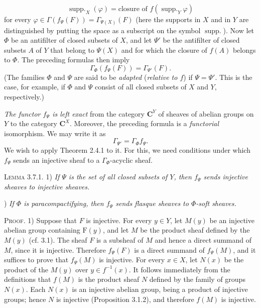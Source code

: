 
\[
\operatorname{supp.}_{X}(\varphi)
=\text{closure of }f(\operatorname{supp.}_{Y}\varphi)
\]
for every $\varphi\in\Gamma(f_\Psi(F))=\Gamma_{\Psi(X)}(F)$ (here the
supports in $X$ and in $Y$ are distinguished by putting the space as a
subscript on the symbol $\operatorname{supp.}$).
Now let $\Phi$ be an antifilter of closed subsets of $X$, and let $\Psi'$ be
the antifilter of closed subsets $A$ of $Y$ that belong to $\Psi(X)$ and for
which the closure of $f(A)$ belongs to $\Phi$. The preceding formulas then
imply
\[
\Gamma_\Phi(f_\Psi(F))=\Gamma_{\Psi'}(F).
\]
(The families $\Phi$ and $\Psi$ are said to be \textit{adapted} (\textit{relative to
$f$}) if $\Psi=\Psi'$. This is the case, for example, if $\Phi$ and $\Psi$
consist of all closed subsets of $X$ and $Y$, respectively.)

\textit{The functor $f_\Psi$ is left exact} from the category $\mathbf C^Y$ of sheaves of
abelian groups on $Y$ to the category $\mathbf C^X$. Moreover, the preceding formula
is a \textit{functorial} isomorphism. We may write it as
\[
\Gamma_{\Psi'}=\Gamma_\Phi f_\Psi.
\]
We wish to apply Theorem 2.4.1 to it. For this, we need conditions under which
$f_\Psi$ sends an injective sheaf to a $\Gamma_\Phi$-acyclic sheaf.

\indent\textsc{Lemma 3.7.1.}
1) \textit{If $\Psi$ is the set of all closed subsets of
$Y$, then $f_\Psi$ sends injective sheaves to injective sheaves.}

) \textit{If $\Phi$ is paracompactifying, then $f_\Psi$
sends flasque sheaves to $\Phi$-soft sheaves.}

\indent\textsc{Proof.} 1) Suppose that $F$ is injective. For every
$y\in Y$, let $M(y)$ be an injective abelian group containing $\mathrm F(y)$, and let
$M$ be the product sheaf defined by the $M(y)$ (cf. 3.1). The sheaf $F$ is a
subsheaf of $M$ and hence a direct summand of $M$, since it is injective.
Therefore $f_\Psi(F)$ is a direct summand of $f_\Psi(M)$, and it suffices to
prove that $f_\Psi(M)$ is injective.
For every $x\in X$, let $N(x)$ be the product of the $M(y)$ over
$y\in f^{-1}(x)$. It follows immediately from the definitions that
$f(M)$ is the product sheaf $N$ defined by the family of groups $N(x)$.
Each $N(x)$ is an injective abelian group, being a product of injective groups;
hence $N$ is injective (Proposition 3.1.2), and therefore $f(M)$ is
injective.

